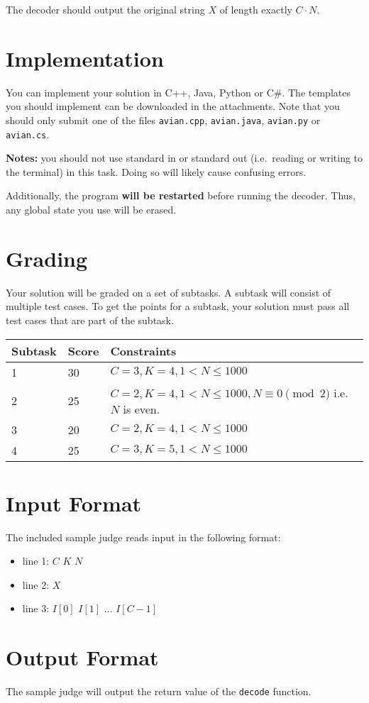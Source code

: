 The decoder should output the original string $X$ of length exactly $C \cdot N$.

\section*{Implementation}
You can implement your solution in C++, Java, Python or C\#.
The templates you should implement can be downloaded in the attachments.
Note that you should only submit one of the files \texttt{avian.cpp}, \texttt{avian.java}, \texttt{avian.py} or \texttt{avian.cs}.

\textbf{Notes:} you should not use standard in or standard out (i.e.\ reading or writing to the terminal) in this task.
Doing so will likely cause confusing errors.

Additionally, the program \textbf{will be restarted} before running the decoder.
Thus, any global state you use will be erased.

\section*{Grading}
Your solution will be graded on a set of subtasks.
A subtask will consist of multiple test cases.
To get the points for a subtask, your solution must pass all test cases that are part of the subtask.

\noindent
\begin{tabular}{| l | l | l |}
\hline
Subtask & Score & Constraints \\ \hline
1       & 30    & $C = 3, K = 4, 1 < N \le 1000$ \\ \hline
2       & 25    & $C = 2, K = 4, 1 < N \le 1000, N \equiv 0 \pmod{2}$ i.e. $N$ is even. \\ \hline
3       & 20    & $C = 2, K = 4, 1 < N \le 1000$ \\ \hline
4       & 25    & $C = 3, K = 5, 1 < N \le 1000$ \\ \hline
\end{tabular}

\section*{Input Format}
The included sample judge reads input in the following format:
\begin{itemize}
	\item line 1: $C$ $K$ $N$
	\item line 2: $X$
	\item line 3: $I[0]$ $I[1]$ $\ldots$ $I[C - 1]$
\end{itemize}

\section*{Output Format}
The sample judge will output the return value of the \texttt{decode} function.
